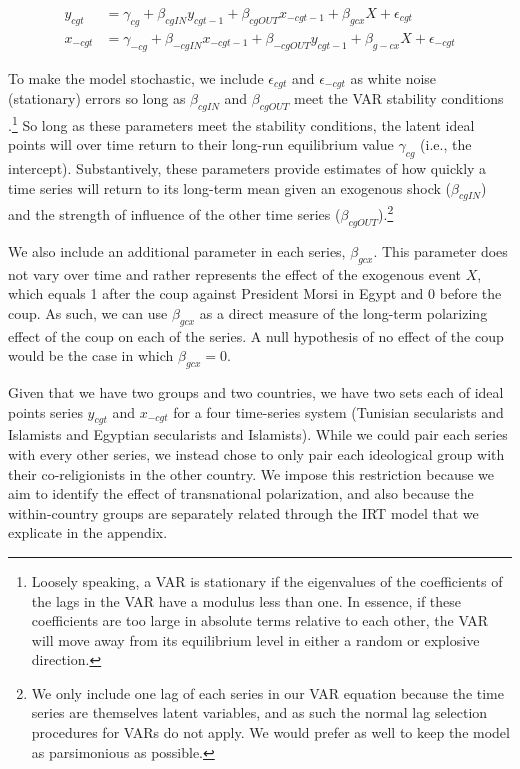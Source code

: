 \documentclass[12pt]{article}
\begin{document}
\begin{align}\label{var}
	y_{cgt} &= \gamma_{cg} + \beta_{cgIN}y_{cgt-1} + \beta_{cgOUT}x_{-cgt-1} + \beta_{gcx}X  + \epsilon_{cgt}\\
	x_{-cgt} &= \gamma_{-cg} + \beta_{-cgIN}x_{-cgt-1} + \beta_{-cgOUT}y_{cgt-1} + \beta_{g-cx}X + \epsilon_{-cgt}
\end{align}

To make the model stochastic, we include $\epsilon_{cgt}$ and $\epsilon_{-cgt}$ as white noise (stationary) errors so long as $\beta_{cgIN}$ and $\beta_{cgOUT}$ meet the VAR stability conditions \parencite[386-387]{zivot2006}.\footnote{Loosely speaking, a VAR is stationary if the eigenvalues of the coefficients of the lags in the VAR have a modulus less than one. In essence, if these coefficients are too large in absolute terms relative to each other, the VAR will move away from its equilibrium level in either a random or explosive direction.} So long as these parameters meet the stability conditions, the latent ideal points will over time return to their long-run equilibrium value $\gamma_{cg}$ (i.e., the intercept). Substantively, these parameters provide estimates of how quickly a time series will return to its long-term mean given an exogenous shock ($\beta_{cgIN}$) and the strength of influence of the other time series ($\beta_{cgOUT}$).\footnote{We only include one lag of each series in our VAR equation because the time series are themselves latent variables, and as such the normal lag selection procedures for VARs do not apply. We would prefer as well to keep the model as parsimonious as possible.}

We also include an additional parameter in each series, $\beta_{gcx}$. This parameter does not vary over time and rather represents the effect of the exogenous event $X$, which equals 1 after the coup against President Morsi in Egypt and 0 before the coup. As such, we can use $\beta_{gcx}$ as a direct measure of the long-term polarizing effect of the coup on each of the series. A null hypothesis of no effect of the coup would be the case in which $\beta_{gcx}=0$.

Given that we have two groups and two countries, we have two sets each of ideal points series $y_{cgt}$ and $x_{-cgt}$ for a four time-series system (Tunisian secularists and Islamists and Egyptian secularists and Islamists). While we could pair each series with every other series, we instead chose to only pair each ideological group with their co-religionists in the other country. We impose this restriction because we aim to identify the effect of transnational polarization, and also because the within-country groups are separately related through the IRT model that we explicate in the appendix.
\end{document}
